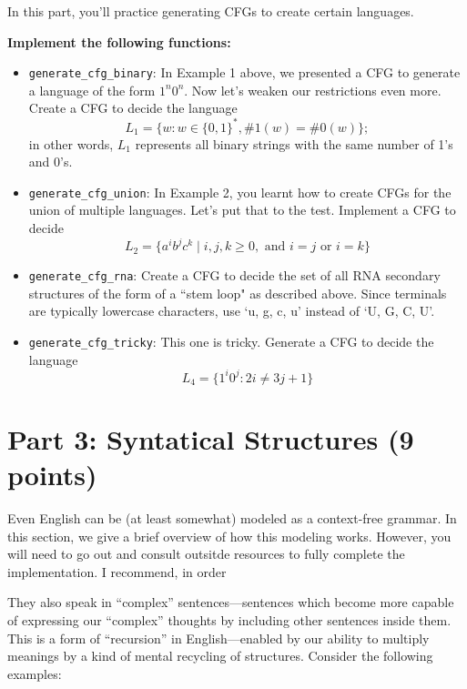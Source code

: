 \documentclass{article}
\begin{document}
\begin{tcolorbox}[enhanced,interior style={top color=Dandelion!20,bottom color=Dandelion!30}]
    In this part, you'll practice generating CFGs to create certain languages.
    
    \textbf{Implement the following functions:}
    
    \begin{itemize}
        \item \lstinline{generate_cfg_binary}: In Example 1 above, we presented a CFG to generate a language of the form $1^{n}0^{n}$. Now let's weaken our restrictions even more. Create a CFG to decide the language $$L_{1} = \{w : w \in \{0, 1\}^{*}, \#1(w) = \#0(w)\};$$ in other words, $L_{1}$ represents all binary strings with the same number of 1's and 0's.
        
        \item \lstinline{generate_cfg_union}: In Example 2, you learnt how to create CFGs for the union of multiple languages. Let's put that to the test. Implement a CFG to decide $$L_{2} = \{a^{i}b^{j}c^{k} \mid i, j, k \ge 0, \text{ and } i = j \text{ or } i = k\}$$
        \item \lstinline{generate_cfg_rna}: Create a CFG to decide the set of all RNA secondary structures of the form of a ``stem loop" as described above. Since terminals are typically lowercase characters, use `u, g, c, u' instead of `U, G, C, U'.
        \item \lstinline{generate_cfg_tricky}: This one is tricky. Generate a CFG to decide the language $$L_{4} = \{1^{i}0^{j} : 2i \ne 3j + 1\}$$
    \end{itemize}
\end{tcolorbox}

\section*{Part 3: Syntatical Structures (9 points)}
    Even English can be (at least somewhat) modeled as a context-free grammar. In this section, we give a brief overview of how this modeling works. However, you will need to go out and consult outsitde resources to fully complete the implementation. I recommend, in order

    They also speak in “complex” sentences—sentences which become more capable of expressing our “complex” thoughts by including other sentences inside them.  This is a form of “recursion” in English—enabled by our ability to multiply meanings by a kind of mental recycling of structures.  Consider the following examples: 
\end{document}
